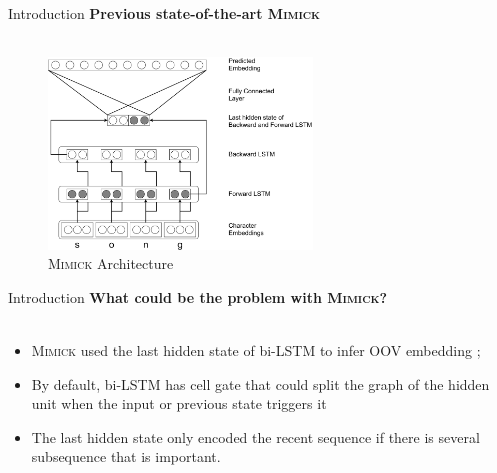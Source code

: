 \documentclass{beamer}
\begin{document}
\begin{frame}{Introduction}
    \textbf{Previous state-of-the-art \textsc{Mimick}}\\~\\

    \begin{figure}[H]
        \centering
        \includegraphics[width=70mm]{images/mimick}
        \caption{\textsc{Mimick} Architecture}
    \end{figure}
\end{frame}


\begin{frame}{Introduction}
    \textbf{What could be the problem with \textsc{Mimick}?}\\~\\

    \begin{itemize}
        \item \textsc{Mimick} used the last hidden state of bi-LSTM to
        infer OOV embedding \cite{mimicking2017Pinter};
        \item By default, bi-LSTM has cell gate that could split
        the graph of the hidden unit when the input or previous state
        triggers it
        \item The last hidden state only encoded the recent sequence
        if there is several subsequence that is important.
    \end{itemize}
\end{frame}





\end{document}
